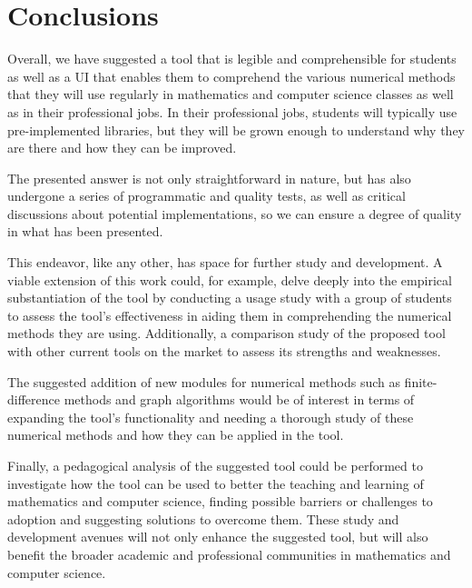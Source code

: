 \chapter{Conclusions}
Overall, we have suggested a tool that is legible and comprehensible for students as well as a UI that enables them to comprehend the various numerical methods that they will use regularly in mathematics and computer science classes as well as in their professional jobs. In their professional jobs, students will typically use pre-implemented libraries, but they will be grown enough to understand why they are there and how they can be improved.

The presented answer is not only straightforward in nature, but has also undergone a series of programmatic and quality tests, as well as critical discussions about potential implementations, so we can ensure a degree of quality in what has been presented.

This endeavor, like any other, has space for further study and development. A viable extension of this work could, for example, delve deeply into the empirical substantiation of the tool by conducting a usage study with a group of students to assess the tool's effectiveness in aiding them in comprehending the numerical methods they are using. Additionally, a comparison study of the proposed tool with other current tools on the market to assess its strengths and weaknesses.


The suggested addition of new modules for numerical methods such as finite-difference methods and graph algorithms would be of interest in terms of expanding the tool's functionality and needing a thorough study of these numerical methods and how they can be applied in the tool.

Finally, a pedagogical analysis of the suggested tool could be performed to investigate how the tool can be used to better the teaching and learning of mathematics and computer science, finding possible barriers or challenges to adoption and suggesting solutions to overcome them. These study and development avenues will not only enhance the suggested tool, but will also benefit the broader academic and professional communities in mathematics and computer science.